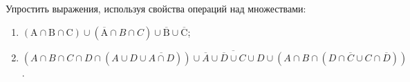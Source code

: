 \question
Упростить выражения, используя свойства операций над множествами:

\begin{enumerate}
	\renewcommand{\labelenumi}{\alph{enumi})}
	\item $(\mathrm{A} \cap \mathrm{B} \cap \mathrm{C}) \cup(\overline{\mathrm{A}} \cap B \cap C) \cup \overline{\mathrm{B}} \cup \overline{\mathrm{C}}$;
	\item $(A\cap B \cap C \cap D \cap (A\cup D \cup \overline{A\cap D}))\cup \overline{\overline{A}\cup \overline{D}\cup C\cup D}\cup (A\cap B \cap (D\cap\overline{C}\cup C\cap\overline{D}))$.
\end{enumerate}
